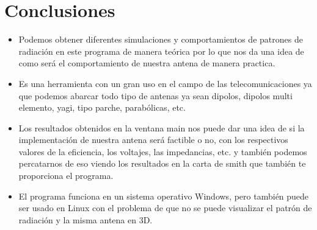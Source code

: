 \documentclass[11pt,a4paper]{article}
\begin{document}
\section{Conclusiones} 
\begin{itemize}
    \item Podemos obtener diferentes simulaciones y comportamientos de patrones de radiación en este programa de manera teórica por lo que nos da una idea de como será el comportamiento de nuestra antena de manera practica.
    \item Es una herramienta con un gran uso en el campo de las telecomunicaciones ya que podemos abarcar todo tipo de antenas ya sean dipolos, dipolos multi elemento, yagi, tipo parche, parab\'olicas, etc.
    \item Los resultados obtenidos en la ventana main nos puede dar una idea de si la implementación de nuestra antena será factible o no, con los respectivos valores de la eficiencia, los voltajes, las impedancias, etc. y también podemos percatarnos de eso viendo los resultados en la carta de smith que también te proporciona el programa.
    \item El programa funciona en un sistema operativo Windows, pero también puede ser usado en Linux con el problema de que no se puede visualizar el patrón de radiación y la misma antena en 3D.
\end{itemize}

\pagebreak
%

\nocite{*}


\end{document}
